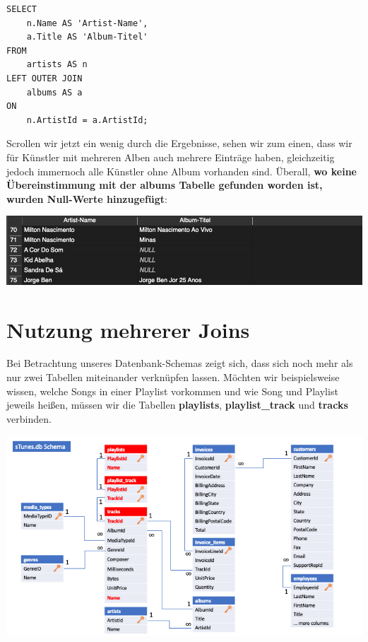 \documentclass[
]{book}
\begin{document}
\begin{verbatim}
SELECT
    n.Name AS 'Artist-Name',
    a.Title AS 'Album-Titel'
FROM
    artists AS n
LEFT OUTER JOIN
    albums AS a
ON
    n.ArtistId = a.ArtistId;
\end{verbatim}

Scrollen wir jetzt ein wenig durch die Ergebnisse, sehen wir zum einen, dass wir für Künstler mit mehreren Alben auch mehrere Einträge haben, gleichzeitig jedoch immernoch alle Künstler ohne Album vorhanden sind. Überall, \textbf{wo keine Übereinstimmung mit der albums Tabelle gefunden worden ist, wurden Null-Werte hinzugefügt}:

\includegraphics[width=10.41667in,height=\textheight]{img-JOIN3.png}

\hypertarget{nutzung-mehrerer-joins}{%
\section{Nutzung mehrerer Joins}\label{nutzung-mehrerer-joins}}

Bei Betrachtung unseres Datenbank-Schemas zeigt sich, dass sich noch mehr als nur zwei Tabellen miteinander verknüpfen lassen. Möchten wir beispielsweise wissen, welche Songs in einer Playlist vorkommen und wie Song und Playlist jeweils heißen, müssen wir die Tabellen \textbf{playlists}, \textbf{playlist\_track} und \textbf{tracks} verbinden.

\includegraphics[width=11.45833in,height=\textheight]{img-sTunes-Schema3.png}
\end{document}
